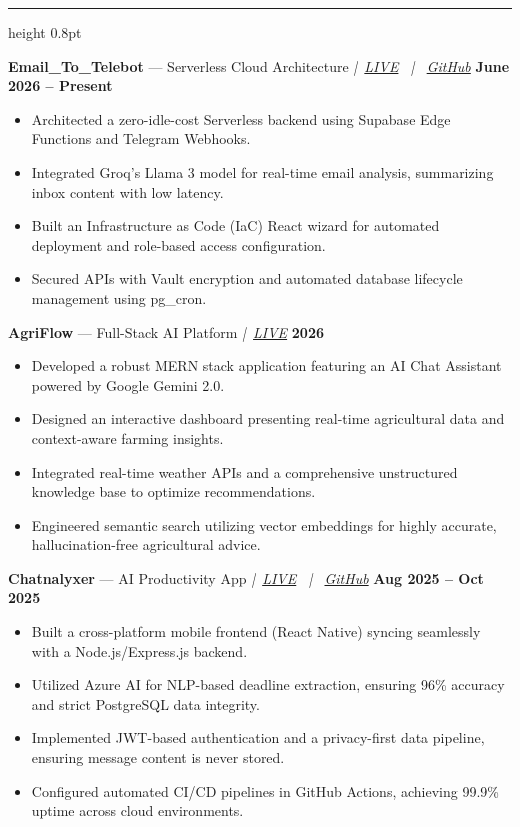 \documentclass[10pt,a4paper]{article}
\newcommand{\resumesection}[1]{%
  \vspace{5pt}%
  \noindent{\large\textbf{#1}}\par
  \vspace{1pt}%
  \hrule height 0.8pt
  \vspace{3pt}%
}
\begin{document}
\resumesection{KEY PROJECTS}

\noindent\textbf{Email\_To\_Telebot} --- Serverless Cloud Architecture \textit{|\ \href{https://rahul-pamula.github.io/Email_to_telebot/}{LIVE} \ | \ \href{https://github.com/Rahul-pamula/Email_to_telebot}{GitHub}} \hfill \textbf{June 2026 -- Present}
\begin{itemize}[leftmargin=1.2em, topsep=1pt, itemsep=0pt, parsep=0pt]
    \item Architected a zero-idle-cost Serverless backend using Supabase Edge Functions and Telegram Webhooks.
    \item Integrated Groq's Llama 3 model for real-time email analysis, summarizing inbox content with low latency.
    \item Built an Infrastructure as Code (IaC) React wizard for automated deployment and role-based access configuration.
    \item Secured APIs with Vault encryption and automated database lifecycle management using pg\_cron.
\end{itemize}

\vspace{3pt}

\noindent\textbf{AgriFlow} --- Full-Stack AI Platform \textit{|\ \href{https://agriflow-frontend.onrender.com/}{LIVE}} \hfill \textbf{2026}
\begin{itemize}[leftmargin=1.2em, topsep=1pt, itemsep=0pt, parsep=0pt]
    \item Developed a robust MERN stack application featuring an AI Chat Assistant powered by Google Gemini 2.0.
    \item Designed an interactive dashboard presenting real-time agricultural data and context-aware farming insights.
    \item Integrated real-time weather APIs and a comprehensive unstructured knowledge base to optimize recommendations.
    \item Engineered semantic search utilizing vector embeddings for highly accurate, hallucination-free agricultural advice.
\end{itemize}

\vspace{3pt}

\noindent\textbf{Chatnalyxer} --- AI Productivity App \textit{|\ \href{http://chatnalyxer.app/}{LIVE} \ | \ \href{https://github.com/Rahul-pamula/chatnalyxer.git}{GitHub}} \hfill \textbf{Aug 2025 -- Oct 2025}
\begin{itemize}[leftmargin=1.2em, topsep=1pt, itemsep=0pt, parsep=0pt]
    \item Built a cross-platform mobile frontend (React Native) syncing seamlessly with a Node.js/Express.js backend.
    \item Utilized Azure AI for NLP-based deadline extraction, ensuring 96\% accuracy and strict PostgreSQL data integrity.
    \item Implemented JWT-based authentication and a privacy-first data pipeline, ensuring message content is never stored.
    \item Configured automated CI/CD pipelines in GitHub Actions, achieving 99.9\% uptime across cloud environments.
\end{itemize}
\end{document}
